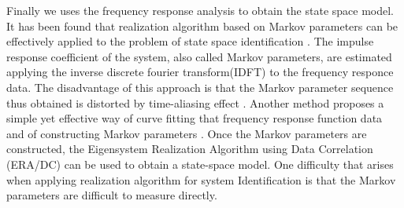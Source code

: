 Finally we uses the frequency response analysis to obtain the state space model. It has been found that realization algorithm based on Markov parameters can be effectively applied to the problem of state space identification\cite{ljung1993some} \cite{mckelvey1996subspace}. The impulse response coefficient of the system, also called Markov parameters, are estimated applying the inverse discrete fourier transform(IDFT) to the frequency responce data\cite{kim1999system}. The disadvantage of this approach is that the Markov parameter sequence thus obtained is distorted by time-aliasing effect \cite{Oppenheim}. Another method proposes a simple yet effective way of curve fitting that frequency response function data and of constructing Markov parameters \cite{chen1993frequency}. Once the Markov parameters are constructed, the Eigensystem Realization Algorithm using Data Correlation (ERA/DC) can be used to obtain a state-space model. One difficulty that arises when applying realization algorithm for system Identification is that the Markov parameters are difficult to measure directly.
